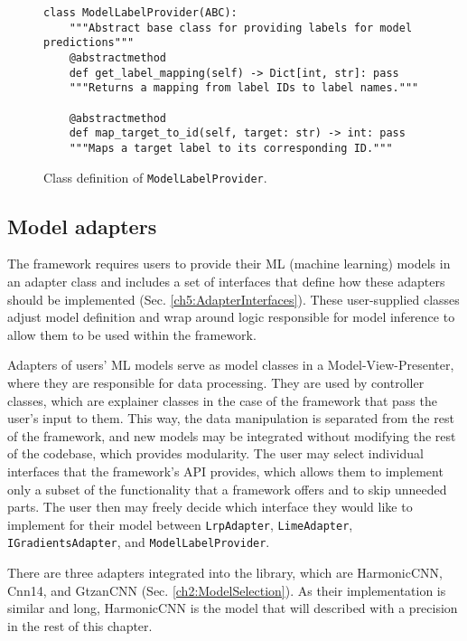 \documentclass[
    bindingoffset=5mm,  %
    footnoteindent=3mm, %
    hyphenation=true    %
]{src/wut-thesis}
\begin{document}
\begin{figure}%
\begin{verbatim}
class ModelLabelProvider(ABC):
    """Abstract base class for providing labels for model predictions"""
    @abstractmethod
    def get_label_mapping(self) -> Dict[int, str]: pass
    """Returns a mapping from label IDs to label names."""

    @abstractmethod
    def map_target_to_id(self, target: str) -> int: pass
    """Maps a target label to its corresponding ID."""
\end{verbatim}
\caption{Class definition of \texttt{ModelLabelProvider}.}
\label{fig:ModelLabelProvider}
\end{figure}

\subsection{Model adapters} \label{ch5:ModelAdapters}

The framework requires users to provide their ML (machine learning) models
in an adapter class and includes a set of interfaces that define how these
adapters should be implemented (Sec. \ref{ch5:AdapterInterfaces}). These user-supplied classes adjust
model definition and wrap around logic responsible for model inference to allow
them to be used within the framework.

Adapters of users’ ML models serve as model classes in a Model-View-Presenter,
where they are responsible for data processing. They are used by controller classes,
which are explainer classes in the case of the framework that pass the user’s input to them.
This way, the data manipulation is separated from the rest of the framework,
and new models may be integrated without modifying the rest of the codebase, which provides modularity.
The user may select individual interfaces that the framework’s API provides,
which allows them to implement only a subset of the functionality that a framework
offers and to skip unneeded parts. The user then may freely decide which interface
they would like to implement for their model between 
\texttt{LrpAdapter}, \texttt{LimeAdapter}, \texttt{IGradientsAdapter}, and \texttt{ModelLabelProvider}.

There are three adapters integrated into the library, which are HarmonicCNN, Cnn14, and GtzanCNN
(Sec. \ref{ch2:ModelSelection}). As their implementation is similar and long, HarmonicCNN is the model
that will described with a precision in the rest of this chapter.
\end{document}
